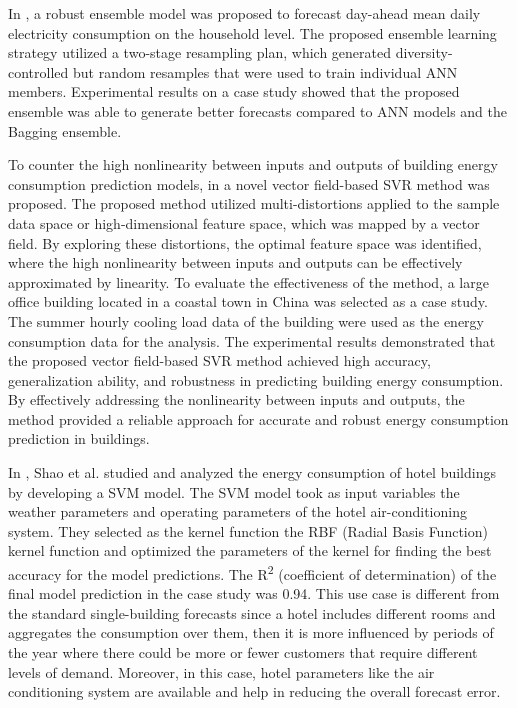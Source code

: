 In \cite{ALOBAIDI2018997}, a robust ensemble model was proposed to forecast day-ahead mean daily electricity consumption on the household level.
The proposed ensemble learning strategy utilized a two-stage resampling plan, which generated diversity-controlled but random resamples that were used to train individual ANN members.
Experimental results on a case study showed that the proposed ensemble was able to generate better forecasts compared to ANN models and the Bagging ensemble.

To counter the high nonlinearity between inputs and outputs of building energy consumption prediction models, in \cite{ZHONG2019403} a novel vector field-based SVR method was proposed.
The proposed method utilized multi-distortions applied to the sample data space or high-dimensional feature space, which was mapped by a vector field.
By exploring these distortions, the optimal feature space was identified, where the high nonlinearity between inputs and outputs can be effectively approximated by linearity.
To evaluate the effectiveness of the method, a large office building located in a coastal town in China was selected as a case study.
The summer hourly cooling load data of the building were used as the energy consumption data for the analysis.
The experimental results demonstrated that the proposed vector field-based SVR method achieved high accuracy, generalization ability, and robustness in predicting building energy consumption.
By effectively addressing the nonlinearity between inputs and outputs, the method provided a reliable approach for accurate and robust energy consumption prediction in buildings.

In \cite{SHAO2020102128}, Shao et al. studied and analyzed the energy consumption of hotel buildings by developing a SVM model.
The SVM model took as input variables the weather parameters and operating parameters of the hotel air-conditioning system.
They selected as the kernel function the RBF (Radial Basis Function) kernel function and optimized the parameters of the kernel for finding the best accuracy for the model predictions.
The R\textsuperscript{2} (coefficient of determination) of the final model prediction in the case study was 0.94.
This use case is different from the standard single-building forecasts since a hotel includes different rooms and aggregates the consumption over them, then it is more influenced by periods of the year where there could be more or fewer customers that require different levels of demand.
Moreover, in this case, hotel parameters like the air conditioning system are available and help in reducing the overall forecast error.

